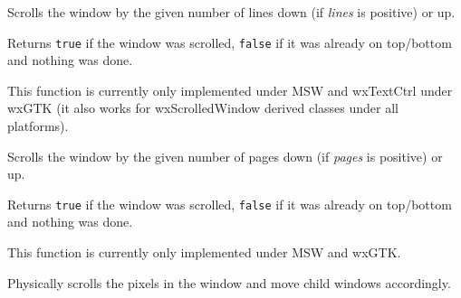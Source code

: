

\label{wxwindowscrolllines}


Scrolls the window by the given number of lines down (if {\it lines} is
positive) or up.


Returns {\tt true} if the window was scrolled, {\tt false} if it was already
on top/bottom and nothing was done.


This function is currently only implemented under MSW and wxTextCtrl under
wxGTK (it also works for wxScrolledWindow derived classes under all
platforms).




\label{wxwindowscrollpages}


Scrolls the window by the given number of pages down (if {\it pages} is
positive) or up.


Returns {\tt true} if the window was scrolled, {\tt false} if it was already
on top/bottom and nothing was done.


This function is currently only implemented under MSW and wxGTK.




\label{wxwindowscrollwindow}


Physically scrolls the pixels in the window and move child windows accordingly.

